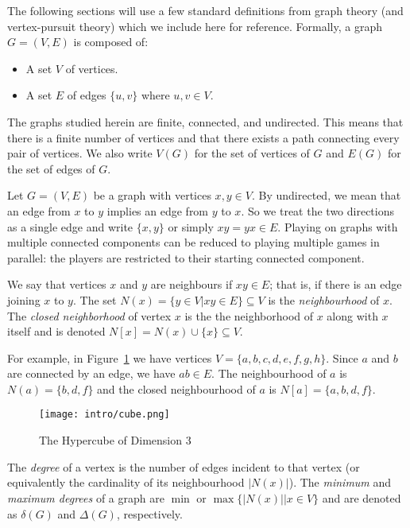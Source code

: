 The following sections will use a few standard definitions from graph theory (and vertex-pursuit theory) which we include here for reference.
Formally, a graph $G = (V, E)$ is composed of:

\begin{itemize}
\item A set $V$ of vertices.
\item A set $E$ of edges $\{u,v\}$ where $u, v \in V$.
\end{itemize}

The graphs studied herein are finite, connected, and undirected.
This means that there is a finite
number of vertices and that there exists a path connecting every pair of vertices.
We also write $V(G)$ for the set of vertices of $G$ and $E(G)$ for the set of edges of $G$.

Let $G = (V,E)$ be a graph with vertices $x,y \in V$.
By undirected, we mean that an edge from $x$ to $y$ implies an edge from $y$ to $x$.
So we treat the two directions as a single edge and write $\{x,y\}$ or simply $xy = yx \in E$.
Playing on graphs with multiple connected components can be reduced to playing
multiple games in parallel: the players are restricted to their starting connected component.

We say that vertices $x$ and $y$ are neighbours if $xy \in E$; that is, if there is an edge joining $x$ to $y$.
The set $N(x) = \{ y \in V | xy \in E \} \subseteq V$ is the \textit{neighbourhood} of $x$.
The \textit{closed neighborhood} of vertex $x$ is the the neighborhood of $x$ along with $x$ itself and is denoted $N[x] = N(x) \cup \{x\} \subseteq V$.

For example, in Figure~\ref{fig:hyper-cube} we have vertices $V = \{ a, b, c, d, e, f, g, h \}$.
Since $a$ and $b$ are connected by an edge, we have $ab \in E$.
The neighbourhood of $a$ is $N(a) = \{ b,d,f \}$ and the closed neighbourhood of $a$ is
$N[a] = \{ a, b, d, f \}$.

\begin{figure}
\centering
\texttt{[image: intro/cube.png]}
\caption{The Hypercube of Dimension 3 \label{fig:hyper-cube}}
\end{figure}

The \textit{degree} of a vertex is the number of edges incident to that vertex (or equivalently the
cardinality of its neighbourhood $\lvert N(x) \rvert$). The \textit{minimum} and \textit{maximum
degrees} of a graph are $\min \text{ or } \max \{ \lvert N(x)\rvert | x \in V\}$ and are denoted as $\delta(G)$ and $\Delta(G)$, respectively.

